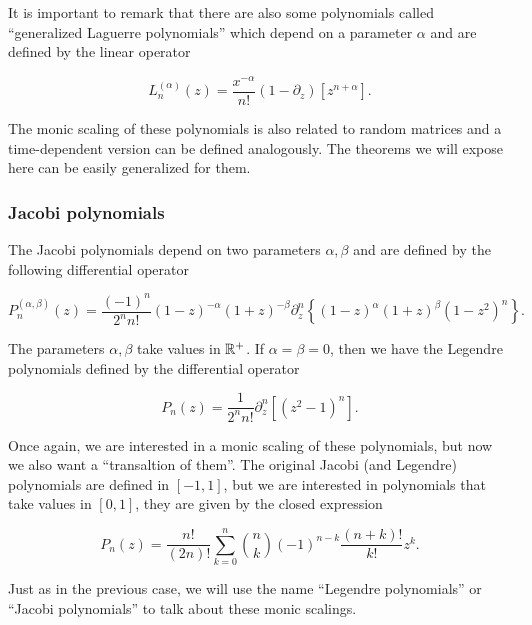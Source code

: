 

        It is important to remark that there are also some polynomials called ``generalized Laguerre polynomials'' which depend on a parameter $\alpha$ and are defined by the linear operator

        \begin{equation*}
            L_n^{(\alpha)}(z) = \frac{x^{-\alpha}}{n!}\left(1 - \partial_z\right)[z^{n+\alpha}].
        \end{equation*}

        The monic scaling of these polynomials is also related to random matrices and a time-dependent version can be defined analogously. The theorems we will expose here can be easily generalized for them.


\subsubsection{Jacobi polynomials}
    
    The Jacobi polynomials depend on two parameters $\alpha,\beta$ and are defined by the following differential operator

    \begin{equation*}
        P_{n}^{(\alpha ,\beta )}(z) = \frac{(-1)^{n}}{2^{n}n!}(1-z)^{-\alpha }(1+z)^{-\beta }\partial_z^n \left\{(1-z)^{\alpha }(1+z)^{\beta }\left(1-z^{2}\right)^{n}\right\}.
    \end{equation*}

    The parameters $\alpha,\beta$ take values in $\mathbb R^+$. If $\alpha = \beta = 0$, then we have the Legendre polynomials defined by the differential operator

    \begin{equation*}
        P_{n}(z) = \frac{1}{2^{n}n!}\partial_z^n [(z^{2}-1)^{n}].
    \end{equation*}

    Once again, we are interested in a monic scaling of these polynomials, but now we also want a ``transaltion of them''. The original Jacobi (and Legendre) polynomials are defined in $[-1,1]$, but we are interested in polynomials that take values in $[0,1]$, they are given by the closed expression

    \begin{equation*}
        P_n(z) = \frac{n!}{(2n)!} \sum_{k=0}^n \binom nk (-1)^{n-k} \frac{(n+k)!}{k!} z^k.
    \end{equation*}

    Just as in the previous case, we will use the name ``Legendre polynomials'' or ``Jacobi polynomials'' to talk about these monic scalings.